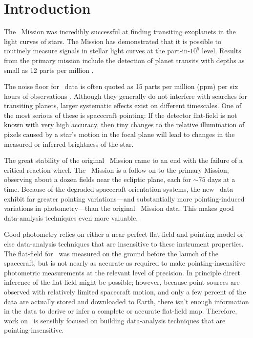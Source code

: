 \section{Introduction}

The \kepler\ Mission was incredibly successful at finding transiting
exoplanets in the light curves of stars.
The Mission has demonstrated that it is possible to routinely measure signals
in stellar light curves at the part-in-$10^5$ level.
Results from the primary mission include the detection of planet transits with
depths as small as 12 parts per million \citep{Barclay:2013}.

The noise floor for \kepler\ data is often quoted as 15 parts per million
(ppm) per six hours of observations \citep{Gilliland:2011}.
Although they generally do not interfere with searches for transiting
planets, larger systematic effects exist on different timescales.
One of the most serious of these is spacecraft pointing: If the detector
flat-field is not known with very high accuracy, then tiny changes to the
relative illumination of pixels caused by a star's motion in the focal plane
will lead to changes in the measured or inferred brightness of the star.

The great stability of the original \kepler\ Mission
came to an end with the failure of a critical reaction wheel.
The \KT\ Mission \citep{Howell:2014} is a follow-on to the primary Mission,
observing about a dozen fields near the ecliptic plane, each for
$\sim 75$ days at a time.
Because of the degraded spacecraft orientation systems, the new \KT\ data
exhibit far greater pointing variations---and substantially more
pointing-induced variations in photometry---than the original \kepler\ Mission
data.
This makes good data-analysis techniques even more valuable.

Good photometry relies on either a near-perfect flat-field
and pointing model or else data-analysis techniques that are
insensitive to these instrument properties.
The flat-field for \kepler\ was measured on the ground before the launch of
the spacecraft, but is not nearly as accurate as required to make
pointing-insensitive photometric measurements at the relevant level of
precision.
In principle direct inference of the flat-field might be possible;
however, because point sources are observed with relatively limited
spacecraft motion, and only a few percent of the data are actually stored and
downloaded to Earth, there isn't enough information in the data to derive or
infer a complete or accurate flat-field map.
Therefore, work on \KT\ is sensibly focused on building data-analysis
techniques that are pointing-insensitive.

